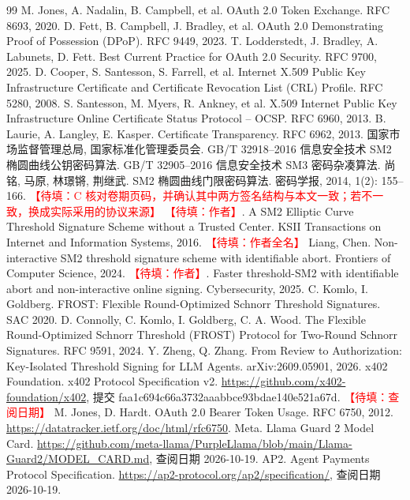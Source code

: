 \documentclass[UTF8,zihao=-4,a4paper]{ctexart}
\newcommand{\fillme}[1]{\textcolor{red}{【待填：#1】}}
\theoremstyle{plain}
\theoremstyle{definition}
\theoremstyle{remark}
\begin{document}
\begin{thebibliography}{99}\small
{} M. Jones, A. Nadalin, B. Campbell, et al. OAuth 2.0 Token Exchange. RFC 8693, 2020.
 D. Fett, B. Campbell, J. Bradley, et al. OAuth 2.0 Demonstrating Proof of Possession (DPoP). RFC 9449, 2023.
 T. Lodderstedt, J. Bradley, A. Labunets, D. Fett. Best Current Practice for OAuth 2.0 Security. RFC 9700, 2025.
 D. Cooper, S. Santesson, S. Farrell, et al. Internet X.509 Public Key Infrastructure Certificate and Certificate Revocation List (CRL) Profile. RFC 5280, 2008.
 S. Santesson, M. Myers, R. Ankney, et al. X.509 Internet Public Key Infrastructure Online Certificate Status Protocol -- OCSP. RFC 6960, 2013.
 B. Laurie, A. Langley, E. Kasper. Certificate Transparency. RFC 6962, 2013.
 国家市场监督管理总局, 国家标准化管理委员会. GB/T 32918--2016 信息安全技术 SM2 椭圆曲线公钥密码算法.
 GB/T 32905--2016 信息安全技术 SM3 密码杂凑算法.
 尚铭, 马原, 林璟锵, 荆继武. SM2 椭圆曲线门限密码算法. 密码学报, 2014, 1(2): 155--166. \fillme{C 核对卷期页码，并确认其中两方签名结构与本文一致；若不一致，换成实际采用的协议来源}
 \fillme{作者}. A SM2 Elliptic Curve Threshold Signature Scheme without a Trusted Center. KSII Transactions on Internet and Information Systems, 2016.
 \fillme{作者全名} Liang, Chen. Non-interactive SM2 threshold signature scheme with identifiable abort. Frontiers of Computer Science, 2024.
 \fillme{作者}. Faster threshold-SM2 with identifiable abort and non-interactive online signing. Cybersecurity, 2025.
 C. Komlo, I. Goldberg. FROST: Flexible Round-Optimized Schnorr Threshold Signatures. SAC 2020.
 D. Connolly, C. Komlo, I. Goldberg, C. A. Wood. The Flexible Round-Optimized Schnorr Threshold (FROST) Protocol for Two-Round Schnorr Signatures. RFC 9591, 2024.
 Y. Zheng, Q. Zhang. From Review to Authorization: Key-Isolated Threshold Signing for LLM Agents. arXiv:2609.05901, 2026.
 x402 Foundation. x402 Protocol Specification v2. \url{https://github.com/x402-foundation/x402}, 提交 faa1c694c66a3732aaabbce93bdae140e521a67d. \fillme{查阅日期}
 M. Jones, D. Hardt. OAuth 2.0 Bearer Token Usage. RFC 6750, 2012. \url{https://datatracker.ietf.org/doc/html/rfc6750}.
 Meta. Llama Guard 2 Model Card. \url{https://github.com/meta-llama/PurpleLlama/blob/main/Llama-Guard2/MODEL_CARD.md}, 查阅日期 2026-10-19.
 AP2. Agent Payments Protocol Specification. \url{https://ap2-protocol.org/ap2/specification/}, 查阅日期 2026-10-19.
\end{thebibliography}
\end{document}

